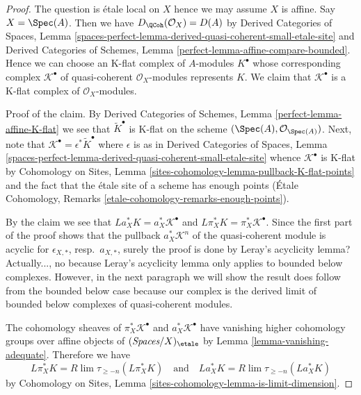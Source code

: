 \begin{proof}
The question is \'etale local on $X$ hence we may assume $X$ is affine.
Say $X = \Spec(A)$. Then we have $D_\QCoh(\mathcal{O}_X) = D(A)$ by
Derived Categories of Spaces, Lemma
\ref{spaces-perfect-lemma-derived-quasi-coherent-small-etale-site}
and
Derived Categories of Schemes, Lemma
\ref{perfect-lemma-affine-compare-bounded}.
Hence we can choose an K-flat complex of $A$-modules
$K^\bullet$ whose corresponding complex
$\mathcal{K}^\bullet$ of quasi-coherent $\mathcal{O}_X$-modules
represents $K$.
We claim that $\mathcal{K}^\bullet$ is a K-flat complex
of $\mathcal{O}_X$-modules.

\medskip\noindent
Proof of the claim. By
Derived Categories of Schemes, Lemma
\ref{perfect-lemma-affine-K-flat}
we see that $\widetilde{K}^\bullet$ is K-flat on the scheme
$(\Spec(A), \mathcal{O}_{\Spec(A)})$.
Next, note that $\mathcal{K}^\bullet = \epsilon^*\widetilde{K}^\bullet$
where $\epsilon$ is as in Derived Categories of Spaces, Lemma
\ref{spaces-perfect-lemma-derived-quasi-coherent-small-etale-site}
whence $\mathcal{K}^\bullet$ is K-flat by
Cohomology on Sites, Lemma \ref{sites-cohomology-lemma-pullback-K-flat-points}
and the fact that the \'etale site of a scheme has enough points
(\'Etale Cohomology, Remarks \ref{etale-cohomology-remarks-enough-points}).

\medskip\noindent
By the claim we see that
$La_X^*K = a_X^*\mathcal{K}^\bullet$ and
$L\pi_X^*K = \pi_X^*\mathcal{K}^\bullet$.
Since the first part of the proof shows that the pullback
$a_X^*\mathcal{K}^n$ of the quasi-coherent module
is acyclic for $\epsilon_{X, *}$, resp.\ $a_{X, *}$, surely the proof is done
by Leray's acyclicity lemma? Actually..., no because Leray's
acyclicity lemma only applies to bounded below complexes.
However, in the next paragraph we will show the result does follow
from the bounded below case because our complex is the derived limit
of bounded below complexes of quasi-coherent modules.

\medskip\noindent
The cohomology sheaves of
$\pi_X^*\mathcal{K}^\bullet$ and $a_X^*\mathcal{K}^\bullet$
have vanishing higher cohomology
groups over affine objects of $(\textit{Spaces}/X)_\etale$ by
Lemma \ref{lemma-vanishing-adequate}.
Therefore we have
$$
L\pi_X^*K = R\lim \tau_{\geq -n}(L\pi_X^*K)
\quad\text{and}\quad
La_X^*K = R\lim \tau_{\geq -n}(La_X^*K)
$$
by Cohomology on Sites, Lemma \ref{sites-cohomology-lemma-is-limit-dimension}.


\end{proof}
